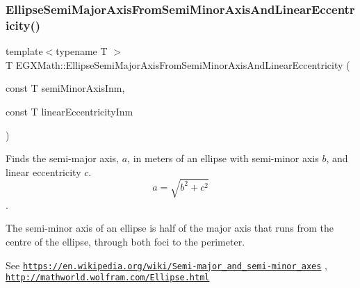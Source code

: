 \mbox{\label{group___e_g_x_math-_geometry-2_d-_ellipse-_semi_major_axis_gaed0cc0b8da6cffa6cb9e28e773bc6e16}} 
\subsubsection{\texorpdfstring{Ellipse\+Semi\+Major\+Axis\+From\+Semi\+Minor\+Axis\+And\+Linear\+Eccentricity()}{EllipseSemiMajorAxisFromSemiMinorAxisAndLinearEccentricity()}}
{\footnotesize\ttfamily template$<$typename T $>$ \\
T E\+G\+X\+Math\+::\+Ellipse\+Semi\+Major\+Axis\+From\+Semi\+Minor\+Axis\+And\+Linear\+Eccentricity (\begin{DoxyParamCaption}\item[{const T}]{semi\+Minor\+Axis\+Inm,  }\item[{const T}]{linear\+Eccentricity\+Inm }\end{DoxyParamCaption})}



Finds the semi-\/major axis, $a$, in meters of an ellipse with semi-\/minor axis $b$, and linear eccentricity $c$. \[ a=\sqrt{b^2+c^2} \]. 

The semi-\/minor axis of an ellipse is half of the major axis that runs from the centre of the ellipse, through both foci to the perimeter.

See \href{https://en.wikipedia.org/wiki/Semi-major_and_semi-minor_axes}{\tt https\+://en.\+wikipedia.\+org/wiki/\+Semi-\/major\+\_\+and\+\_\+semi-\/minor\+\_\+axes} , \href{http://mathworld.wolfram.com/Ellipse.html}{\tt http\+://mathworld.\+wolfram.\+com/\+Ellipse.\+html}


